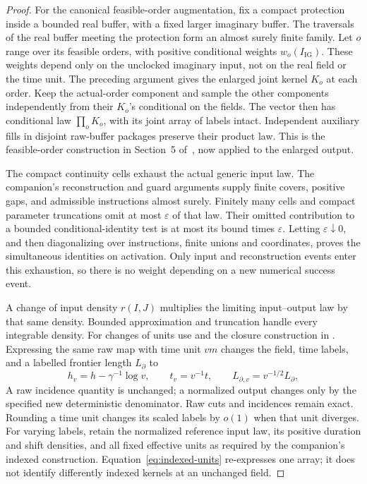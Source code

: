 \begin{proof}
For the canonical feasible-order augmentation, fix a compact protection
inside a bounded real buffer, with a fixed larger imaginary buffer.
The traversals of the real buffer meeting the protection form an almost
surely finite family.  Let \(o\) range over its feasible orders, with
positive conditional weights \(w_o(I_{\mathrm{IG}})\).  These weights depend
only on the unclocked imaginary input, not on the real field or the
time unit.  The preceding argument gives the enlarged joint kernel
\(K_o\) at each order.  Keep the actual-order component and sample the
other components independently from their \(K_o\)'s conditional on
the fields.  The vector then has conditional law \(\prod_oK_o\),
with its joint array of labels intact.  Independent auxiliary fills
in disjoint raw-buffer packages preserve their product law.  This is
the feasible-order construction in Section~5 of~\cite{C}, now applied
to the enlarged output.

The compact continuity cells exhaust the actual generic input law.
The companion's reconstruction and guard arguments supply finite
covers, positive gaps, and admissible instructions almost surely.
Finitely many cells and compact parameter truncations omit at most
\(\varepsilon\) of that law.  Their omitted contribution to a bounded
conditional-identity test is at most its bound times \(\varepsilon\).
Letting \(\varepsilon\downarrow0\), and then diagonalizing over
instructions, finite unions and coordinates, proves the simultaneous
identities on activation.  Only input and reconstruction events enter this
exhaustion, so there is no weight depending on a new numerical success
event.

A change of input density \(r(I,J)\) multiplies the limiting
input--output law by that same density.  Bounded approximation and
truncation handle every integrable density.  For changes of units use
\cite[Proposition~5.12]{C} and the closure construction in
\cite[Section~7]{P}.  Expressing the same raw map with time unit \(vm\)
changes the field, time labels, and a labelled frontier length
\(L_\partial\) to
\begin{equation}
 h_v=h-\gamma^{-1}\log v,\qquad t_v=v^{-1}t,\qquad
 L_{\partial,v}=v^{-1/2}L_\partial ,
 \label{eq:indexed-units}
\end{equation}
A raw incidence quantity is unchanged; a normalized output changes
only by the specified new deterministic denominator.  Raw cuts and
incidences remain exact.  Rounding a time unit changes its scaled
labels by \(o(1)\) when that unit diverges.  For varying labels, retain
the normalized reference input law, its positive duration and shift
densities, and all fixed effective units as required by the companion's
indexed construction.  Equation~\eqref{eq:indexed-units} re-expresses
one array; it does not identify differently indexed kernels at an
unchanged field.


\end{proof}
